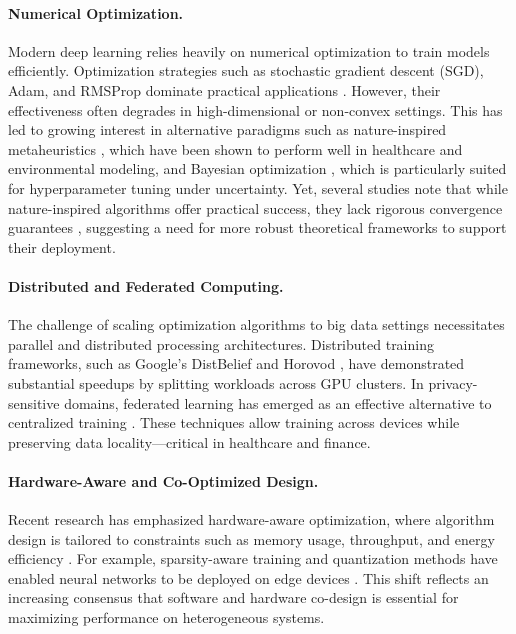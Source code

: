 \documentclass[acmsmall]{acmart}
\begin{document}
\paragraph{Numerical Optimization.}
Modern deep learning relies heavily on numerical optimization to train models efficiently. Optimization strategies such as stochastic gradient descent (SGD), Adam,
and RMSProp dominate practical applications \citep{ruder2016overview}. However, their effectiveness often degrades in high-dimensional or non-convex settings.
This has led to growing interest in alternative paradigms such as nature-inspired metaheuristics \citep{Fong2023, Chen2016331, idrissi2016genetic}, which have been shown to perform well in
healthcare and environmental modeling, and Bayesian optimization \citep{snoek2012practical, klein2017fast}, which is particularly suited for hyperparameter tuning under uncertainty.
Yet, several studies note that while nature-inspired algorithms offer practical success, they lack rigorous convergence guarantees \citep{yang2020nature, zhou2021heuristic}, suggesting a need for more
robust theoretical frameworks to support their deployment.

\paragraph{Distributed and Federated Computing.}
The challenge of scaling optimization algorithms to big data settings necessitates parallel and distributed processing architectures. Distributed training frameworks,
such as Google's DistBelief \citep{dean2012large} and Horovod \citep{sergeev2018horovod}, have demonstrated substantial speedups by splitting workloads across GPU clusters.
In privacy-sensitive domains, federated learning has emerged as an effective alternative to centralized training \citep{mcmahan2017communication}.
These techniques allow training across devices while preserving data locality—critical in healthcare and finance.

\paragraph{Hardware-Aware and Co-Optimized Design.}
Recent research has emphasized hardware-aware optimization, where algorithm design is tailored to constraints such as memory usage, throughput, and energy efficiency \citep{capra2020hardware}.
For example, sparsity-aware training and quantization methods have enabled neural networks to be deployed on edge devices \citep{han2015deep}.
This shift reflects an increasing consensus that software and hardware co-design is essential for maximizing performance on heterogeneous systems.
\end{document}
